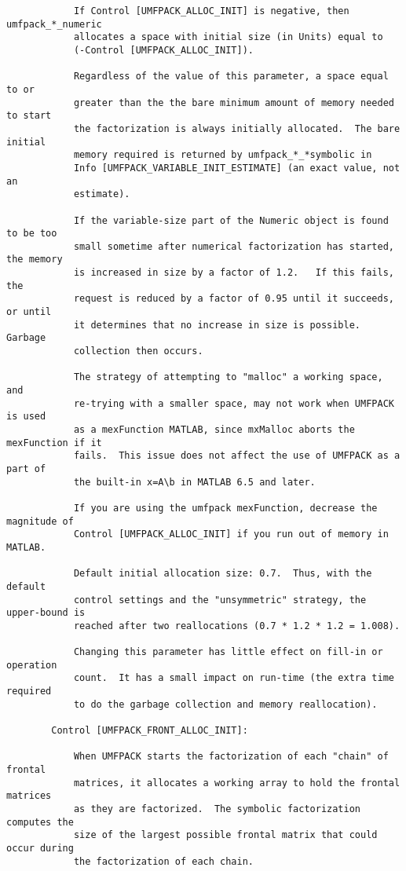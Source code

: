 \documentclass[11pt]{article}
\begin{document}
{\begin{verbatim}
            If Control [UMFPACK_ALLOC_INIT] is negative, then umfpack_*_numeric
            allocates a space with initial size (in Units) equal to
            (-Control [UMFPACK_ALLOC_INIT]).

            Regardless of the value of this parameter, a space equal to or
            greater than the the bare minimum amount of memory needed to start
            the factorization is always initially allocated.  The bare initial
            memory required is returned by umfpack_*_*symbolic in
            Info [UMFPACK_VARIABLE_INIT_ESTIMATE] (an exact value, not an
            estimate).

            If the variable-size part of the Numeric object is found to be too
            small sometime after numerical factorization has started, the memory
            is increased in size by a factor of 1.2.   If this fails, the
            request is reduced by a factor of 0.95 until it succeeds, or until
            it determines that no increase in size is possible.  Garbage
            collection then occurs.

            The strategy of attempting to "malloc" a working space, and
            re-trying with a smaller space, may not work when UMFPACK is used
            as a mexFunction MATLAB, since mxMalloc aborts the mexFunction if it
            fails.  This issue does not affect the use of UMFPACK as a part of
            the built-in x=A\b in MATLAB 6.5 and later.

            If you are using the umfpack mexFunction, decrease the magnitude of
            Control [UMFPACK_ALLOC_INIT] if you run out of memory in MATLAB.

            Default initial allocation size: 0.7.  Thus, with the default
            control settings and the "unsymmetric" strategy, the upper-bound is
            reached after two reallocations (0.7 * 1.2 * 1.2 = 1.008).

            Changing this parameter has little effect on fill-in or operation
            count.  It has a small impact on run-time (the extra time required
            to do the garbage collection and memory reallocation).

        Control [UMFPACK_FRONT_ALLOC_INIT]:

            When UMFPACK starts the factorization of each "chain" of frontal
            matrices, it allocates a working array to hold the frontal matrices
            as they are factorized.  The symbolic factorization computes the
            size of the largest possible frontal matrix that could occur during
            the factorization of each chain.


\end{verbatim}}
\end{document}
